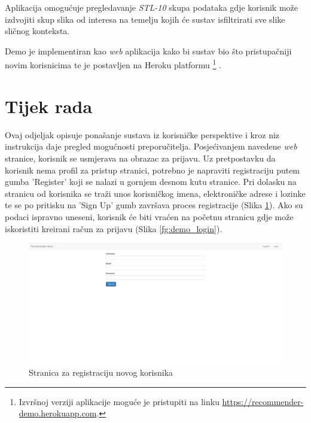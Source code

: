 \documentclass[times, utf8, proizvoljni, numeric]{fer}
\begin{document}
Aplikacija omogućuje pregledavanje \textit{STL-10} skupa podataka gdje korisnik može izdvojiti skup slika od interesa na temelju kojih će sustav isfiltrirati sve slike sličnog konteksta.

Demo je implementiran kao \textit{web} aplikacija kako bi sustav bio što pristupačniji novim korisnicima te je postavljen na Heroku platformu \footnote{Izvršnoj verziji aplikacije moguće je pristupiti na linku \url{https://recommender-demo.herokuapp.com}.} .


\section{Tijek rada}

Ovaj odjeljak opisuje ponašanje sustava iz korisničke perspektive i kroz niz instrukcija daje pregled mogućnosti preporučitelja. Posjećivanjem navedene \textit{web} stranice, korisnik se usmjerava na obrazac za prijavu. Uz pretpostavku da korisnik nema profil za pristup stranici, potrebno je napraviti registraciju putem gumba 'Register' koji se nalazi u gornjem desnom kutu stranice. Pri dolasku na stranicu od korisnika se traži unos korisničkog imena, elektroničke adrese i lozinke te se po pritisku na 'Sign Up' gumb završava proces registracije (Slika \ref{fg:demo_register}). Ako su podaci ispravno uneseni, korisnik će biti vraćen na početnu stranicu gdje može iskoristiti kreirani račun za prijavu (Slika \ref{fg:demo_login}). 
 
\begin{figure}[H]
	\begin{center}
		\captionsetup{justification=centering}
		\includegraphics[width=1.0\textwidth]{./imgs/demo-preporucitelja-po-sadrzaju/tijek-rada/demo-regi.png}
		\caption{Stranica za registraciju novog korisnika}
		\label{fg:demo_register}
	\end{center}
\end{figure}
\end{document}
